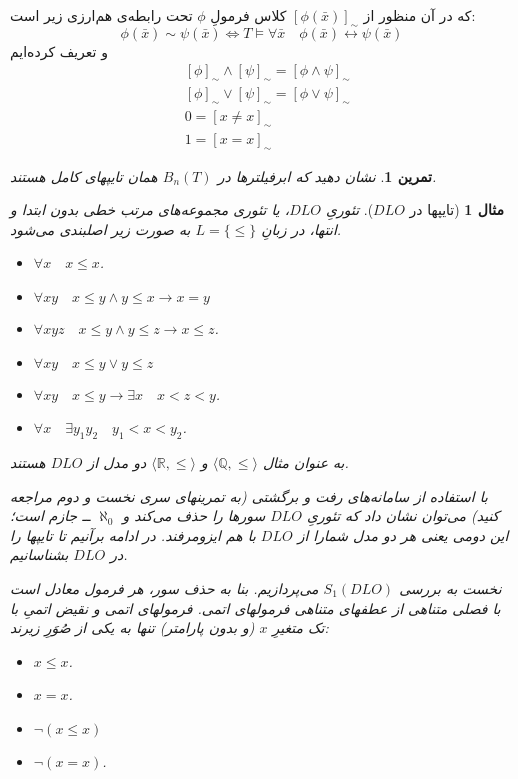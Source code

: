 \documentclass[12pt,a4paper]{article}
\theoremstyle{colorhead}
\newtheorem{tam}[thm]{تمرین}
\newtheorem{mesal}[thm]{مثال}
\begin{document}
که در آن منظور از
$[\phi(\bar{x})]_\sim$
کلاس فرمولِ
$\phi$
تحت رابطه‌ی هم‌ارزی زیر است:
\[
\phi(\bar{x})\sim \psi(\bar{x})\Leftrightarrow T\models \forall \bar{x}
\quad \phi(\bar{x})\leftrightarrow \psi(\bar{x})
\]
و تعریف کرده‌ایم
\begin{align*}
& [\phi]_\sim \wedge [\psi]_\sim=[\phi\wedge\psi]_\sim\\
& [\phi]_\sim \vee [\psi]_\sim=[\phi\vee\psi]_\sim\\
& 0=[x\not=x]_\sim\\
& 1=[x=x]_\sim 
\end{align*}
\begin{tam}
نشان دهید که ابرفیلترها
در
$B_n(T)$
همان تایپهای کامل هستند.
\end{tam}
\begin{mesal}[تایپها در
$DLO$]
تئوریِ
$DLO$،
یا تئوری مجموعه‌های مرتب خطی بدون ابتدا و انتها، در زبانِ
$L=\{\leq\}$
به صورت زیر اصلبندی می‌شود.
\begin{itemize}
\item 
$\forall x \quad x\leq x$.
\item 
$\forall xy \quad x\leq y \wedge y\leq x\to x=y$
\item 
$\forall xyz \quad x\leq y\wedge y\leq z\to x\leq z$.
\item
$\forall xy \quad x\leq y \vee y\leq z$
\item 
$\forall xy\quad x\leq y\to \exists x  \quad x<z< y$.
\item 
$\forall x\quad \exists y_1y_2 \quad y_1<x<y_2$.
\end{itemize}
به عنوان مثال
$\langle \mathbb{Q},\leq\rangle$
و
$\langle \mathbb{R},\leq\rangle$
دو مدل از 
$DLO$
هستند. 
\par 
با استفاده از سامانه‌های رفت و برگشتی (به تمرینهای سری نخست و دوم مراجعه کنید)
می‌توان نشان داد که تئوریِ
$DLO$
سورها را حذف می‌کند و
$\aleph_0$
ــ 
جازم است؛ این دومی یعنی  هر دو مدل شمارا از
$DLO$
با هم ایزومرفند. در ادامه برآنیم تا تایپها را در
$DLO$
بشناسانیم.
\par 
نخست به بررسی
$S_1(DLO)$
می‌پردازیم. بنا به حذف سور، هر فرمول معادل است با
فصلی متناهی از عطفهای متناهی فرمولهای اتمی. فرمولهای اتمی و نقیض اتمیِ
با تک متغیرِ
$x$
(و بدون پارامتر)
تنها به یکی از صُوَرِ زیرند:
\begin{itemize}
\item $x\leq x$.
\item $x=x$.
\item $\neg (x\leq x)$
\item $\neg (x=x)$.
\end{itemize}

\end{mesal}
\end{document}
